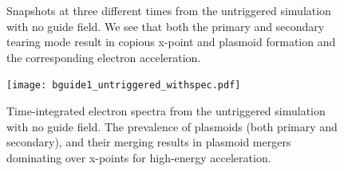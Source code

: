 \documentclass[iop,twocolappendix]{emulateapj}
\begin{document}
\begin{figure}[!h]
	\caption{Snapshots at three different times from the untriggered simulation with no guide field.  We see that both the primary and secondary tearing mode result in copious x-point and plasmoid formation and the corresponding electron acceleration.  
	}
	\label{untriggered_bguide0_snapshots}
\end{figure}

\begin{figure}[htp]
	
	\texttt{[image: bguide1\_untriggered\_withspec.pdf]}
	\caption{Time-integrated electron spectra from the untriggered simulation with no guide field.  The prevalence of plasmoids (both primary and secondary), and their merging results in plasmoid mergers dominating over x-points for high-energy acceleration.}
	\label{untriggered_bguide1_spec}
\end{figure}
\end{document}
